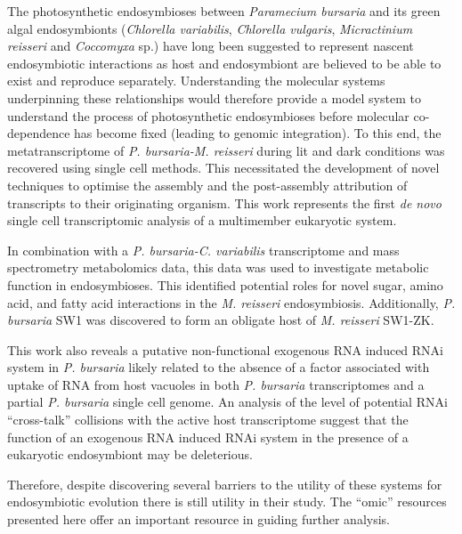 The photosynthetic endosymbioses between \textit{Paramecium bursaria} and its green algal endosymbionts 
(\textit{Chlorella variabilis}, \textit{Chlorella vulgaris}, \textit{Micractinium reisseri} and \textit{Coccomyxa} sp.) 
have long been suggested to represent nascent endosymbiotic interactions 
as host and endosymbiont are believed to be able to exist and reproduce separately. 
Understanding the molecular systems underpinning these relationships would therefore 
provide a model system to understand the process of photosynthetic endosymbioses 
before molecular co-dependence has become fixed (leading to genomic integration).
To this end, the metatranscriptome of \textit{P. bursaria-M. reisseri} during 
lit and dark conditions was recovered using single cell methods. 
This necessitated the development of novel techniques to optimise the 
assembly and the post-assembly attribution of transcripts to their originating organism. 
This work represents the first \textit{de novo} single cell transcriptomic analysis of a multimember eukaryotic system.  


In combination with a \textit{P. bursaria-C. variabilis} transcriptome and 
mass spectrometry metabolomics data, 
this data was used to investigate metabolic function in endosymbioses. 
This identified potential roles for novel sugar, amino acid, and 
fatty acid interactions in the \textit{M. reisseri} endosymbiosis.
Additionally, \textit{P. bursaria} SW1 was discovered to form an obligate host of
\textit{M. reisseri} SW1-ZK.

 
This work also reveals a putative non-functional exogenous RNA induced 
RNAi system in \textit{P. bursaria} likely related to the absence of a factor 
associated with uptake of RNA from host vacuoles in both \textit{P. bursaria}
transcriptomes and a partial \textit{P. bursaria} single cell genome.  
An analysis of the level of potential RNAi ``cross-talk'' 
collisions with the active host transcriptome suggest that the function of an 
exogenous RNA induced RNAi system in the presence of a eukaryotic endosymbiont may be deleterious.

 
Therefore, despite discovering several barriers to the utility of these systems for endosymbiotic 
evolution there is still utility in their study. The “omic'' resources presented here 
offer an important resource in guiding further analysis.

